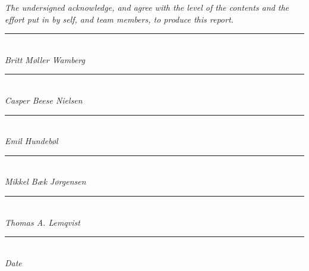 \textit{\huge{The undersigned acknowledge, and agree with the level of the contents and the effort put in by self, and team members, to produce this report.}}
\vfill
\begin{multicols}{2}
\begin{center}
	\rule{8cm}{1pt}
\textit{\\Britt Møller Wamberg\\}
\vspace{2cm}
	\rule{8cm}{1pt}
\textit{\\Casper Beese Nielsen\\}
\columnbreak
	\rule{8cm}{1pt}
\textit{\\Emil Hundebøl\\}
\vspace{2cm}
	\rule{8cm}{1pt}
\textit{\\Mikkel Bæk Jørgensen\\}
\end{center}
\end{multicols}
\begin{center}
\vspace{2cm}
	\rule{8cm}{1pt}
\textit{\\Thomas A. Lemqvist\\}
\vspace{2cm}
\rule{8cm}{1pt}
\textit{\\Date}
\end{center}
\vfill